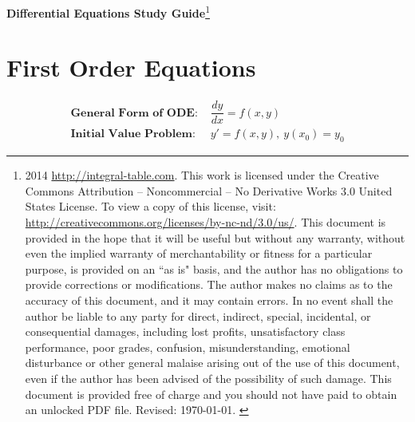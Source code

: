\documentclass[10pt,portrait, leqno]{article}
\begin{document}
\pagestyle{empty}
 
\begin{center}
\begin{LARGE}\textbf{Differential Equations Study Guide}\footnote{{\scriptsize \textcopyleft \hspace{.5ex} 2014 \hspace{.5ex} \url{http://integral-table.com}. This work is licensed under the Creative Commons Attribution --  Noncommercial -- No Derivative Works 3.0 United States License. To view a copy of this license, visit:  \url{http://creativecommons.org/licenses/by-nc-nd/3.0/us/}. This document is provided in the hope that it will be useful but without any warranty, without even the implied warranty of merchantability or fitness for a particular purpose, is provided on an ``as is" basis,  and the author has no obligations to provide corrections or modifications. The author makes no claims as to the accuracy of this document, and  it may contain errors. In no event shall the author be liable to any party for direct, indirect, special, incidental, or consequential damages, including lost profits, unsatisfactory class performance, poor grades, confusion, misunderstanding, emotional disturbance or other general malaise arising out of the use of this document, even if the author has been advised of the possibility of such damage. This document is provided free of charge and you should not have paid to obtain an unlocked PDF file. Revised: \today. }
 }\end{LARGE}

\section*{First Order Equations}
\begin{minipage}{4in}
\begin{align}
\textbf{General Form of ODE:\ }& \dfrac{dy}{dx}=f(x,y)\\
\textbf{Initial Value Problem:\ }& y'=f(x,y),\ y(x_0) = y_0
\end{align}
\end{minipage}

\end{center}
\vspace{1em}
\end{document}
